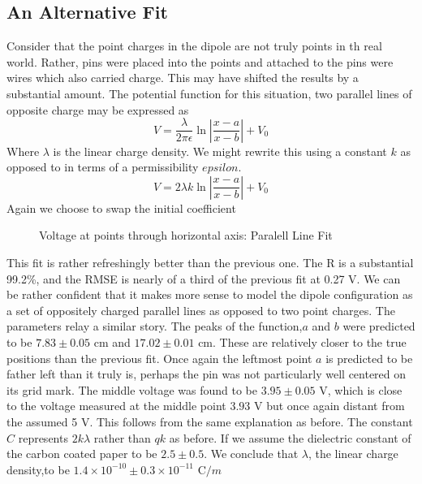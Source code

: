 \documentclass[11pt]{article}
\begin{document}
\subsection{An Alternative Fit}
Consider that the point charges in the dipole are not truly points in th real world. Rather, pins were placed into the points and attached to the pins were wires which also carried charge. This may have shifted the results by a substantial amount. The potential function for this situation, two parallel lines of opposite charge may be expressed as
\begin{equation}
V = \frac{\lambda}{2 \pi \epsilon}\ln\left|\frac{x-a}{x-b}\right| + V_0
\end{equation}
Where \(\lambda\) is the linear charge density.
We might rewrite this using a constant \(k\) as opposed to in terms of a permissibility \(epsilon\).
\begin{equation}
V = 2 \lambda k \ln\left|\frac{x-a}{x-b}\right| + V_0
\end{equation}
Again we choose to swap the initial coefficient
\begin{figure}[h]
	\centering
	\caption{Voltage at points through horizontal axis: Paralell Line Fit}
\end{figure}
This fit is rather refreshingly better than the previous one. The \(\mathrm{R}\) is a substantial 99.2\%, and the RMSE is nearly of a third of the previous fit at 0.27 V. We can be rather confident that it makes more sense to model the dipole configuration as a set of oppositely charged parallel lines as opposed to two point charges. The parameters relay a similar story. The peaks of the function,\(a\) and \(b\) were predicted to be \(7.83 \pm 0.05\) cm and \(17.02 \pm 0.01\) cm. These are relatively closer to the true positions than the previous fit. Once again the leftmost point \(a\) is predicted to be father left than it truly is, perhaps the pin was not particularly well centered on its grid mark. The middle voltage was found to be \(3.95 \pm 0.05\) V, which is close to the voltage measured at the middle point \(3.93 \) V but once again distant from the assumed 5 V. This follows from the same explanation as before. The constant \(C\) represents \(2 k \lambda\) rather than \(q k \) as before. If we assume the dielectric constant of the carbon coated paper to be \(2.5 \pm 0.5\). We conclude that \(\lambda\), the linear charge density,to be \(1.4 \times 10^{-10} \pm 0.3 \times 10^{-11}\)  \(\mathrm{C}/m\)
\end{document}

